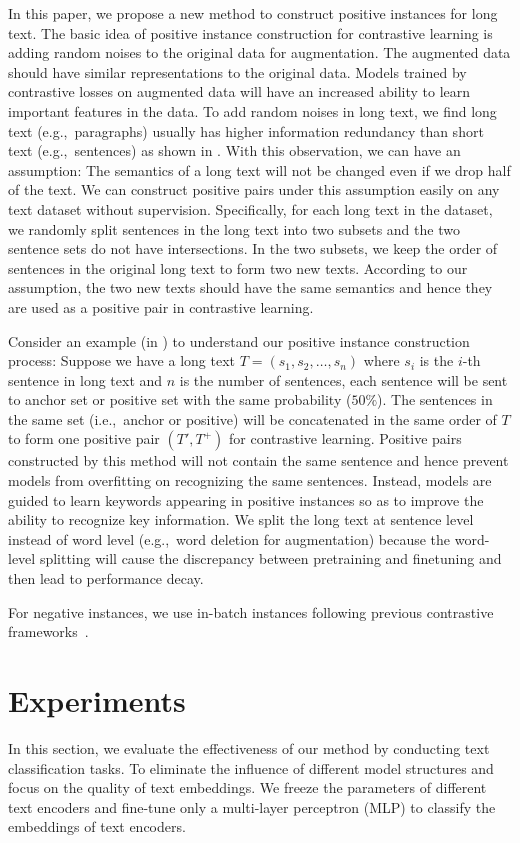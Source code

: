 \documentclass[11pt]{article}
\newcommand{\todo}[1]{{\color{red}{#1}}}
\begin{document}
In this paper, we propose a new method to construct positive instances for long text. 
The basic idea of positive instance construction for contrastive learning is adding random noises to the original data for augmentation. 
The augmented data should have similar representations to the original data. 
Models trained by contrastive losses on augmented data will have an increased ability to learn important features in the data.
To add random noises in long text, we find long text (e.g.,~paragraphs) usually has higher information redundancy than short text (e.g.,~sentences) as shown in \todo{Table}. With this observation, we can have an assumption: 
The semantics of a long text will not be changed even if we drop half of the text. 
We can construct positive pairs under this assumption easily on any text dataset without supervision.
Specifically, for each long text in the dataset, we randomly split sentences in the long text into two subsets and the two sentence sets do not have intersections. 
In the two subsets, we keep the order of sentences in the original long text to form two new texts. 
According to our assumption, the two new texts should have the same semantics and hence they are used as a positive pair in contrastive learning. 

Consider an example (in \todo{Figure}) to understand our positive instance construction process:
Suppose we have a long text $T = (s_1, s_2,\dots,s_n)$ where $s_i$ is the $i$-th sentence in long text and $n$ is the number of sentences, each sentence will be sent to anchor set or positive set with the same probability ($50\%$). 
The sentences in the same set (i.e.,~anchor or positive) will be concatenated in the same order of $T$ to form one positive pair $(T', T^+)$ for contrastive learning. 
Positive pairs constructed by this method will not contain the same sentence and hence prevent models from overfitting on recognizing the same sentences. 
Instead, models are guided to learn keywords appearing in positive instances so as to improve the ability to recognize key information. 
We split the long text at sentence level instead of word level (e.g.,~word deletion for augmentation) because the word-level splitting will cause the discrepancy between pretraining and finetuning and then lead to performance decay.

For negative instances, we use in-batch instances following previous contrastive frameworks~\cite{Gao2021SimCSESC, Li2022UCTopicUC}.

\section{Experiments}
In this section, we evaluate the effectiveness of our method by conducting text classification tasks. 
To eliminate the influence of different model structures and focus on the quality of text embeddings. 
We freeze the parameters of different text encoders and fine-tune only a multi-layer perceptron (MLP) to classify the embeddings of text encoders.
\end{document}
